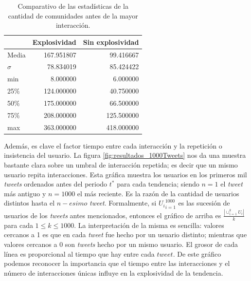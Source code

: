 \documentclass[../main.tex]{subfiles}
\begin{document}
\begin{table}[]
    \centering
    \caption{Comparativo de las estadísticas de la cantidad de comunidades antes de la mayor interacción.}
    \label{tab:resulatdos_comparativodecomunidades}
    \begin{tabular}{lrr}
\toprule
{} &  Explosividad &  Sin explosividad \\
\midrule
Media  &    167.951807 &         99.416667 \\
$\sigma$   &     78.834019 &         85.424422 \\
min   &      8.000000 &          6.000000 \\
25\%   &    124.000000 &         40.750000 \\
50\%   &    175.000000 &         66.500000 \\
75\%   &    208.000000 &        125.500000 \\
max   &    363.000000 &        418.000000 \\
\bottomrule
\end{tabular}
\end{table}


Además, es clave el factor tiempo entre cada interacción y la repetición o insistencia del usuario. La figura \ref{fig:resultados_1000Tweets}  nos da una muestra bastante clara sobre un umbral de interacción repetida; es decir que un mismo usuario repita interacciones. Esta gráfica muestra los usuarios en los primeros mil \textit{tweets} ordenados antes del periodo $t^{*}$ para cada tendencia; siendo $n =1$ el \textit{tweet} más antiguo y $n=1000$ el más reciente. Es la razón de la cantidad de usuarios distintos hasta el $n-esimo$ \textit{tweet}. Formalmente, si ${U_{i} }_{i=1}^{1000}$ es las sucesión de usuarios de los \textit{tweets} antes mencionados, entonces el gráfico de arriba es $\frac{|\cup_{i=1}^{k} U_{i} |}{k}$ para cada $1 \leq k \leq 1000$.
 La interpretación de la misma es sencilla:  valores cercanos a 1 es que en cada \textit{tweet} fue hecho por un usuario distinto; mientras que valores cercanos a 0 son \textit{tweets} hecho por un mismo usuario. El grosor de cada línea es proporcional al tiempo que hay entre cada $tweet$. De este gráfico podemos reconocer la importancia que el tiempo entre las interacciones y el número de interacciones únicas influye en la explosividad de la tendencia.
\end{document}
